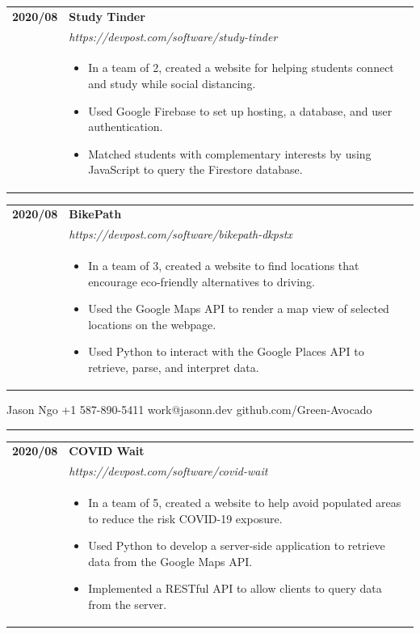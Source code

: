 \documentclass[letterpaper]{article}
\makeatletter
\newcommand{\secondpage}{\pagebreak
                            {\small
                                Jason Ngo
                                \hfill
                                +1 587-890-5411
                                \hfill
                                work@jasonn.dev
                                \hfill
                                github.com/Green-Avocado
                            }
                            \vspace{-4pt}

                            \rule{\textwidth}{0.1pt}

                            \vspace{0.2in}}
\makeatother
\begin{document}
        \begin{tabular}{p{} p{}}
            \textbf{2020/08} & \textbf{Study Tinder} \\
            & \emph{https://devpost.com/software/study-tinder} \\
            & \begin{itemize}
                \item In a team of 2, created a website for helping students connect and study while
                    social distancing.
                \item Used Google Firebase to set up hosting, a database, and user authentication.
                \item Matched students with complementary interests by using JavaScript to query the
                    Firestore database.
            \end{itemize}
        \end{tabular}

        \begin{tabular}{p{} p{}}
            \textbf{2020/08} & \textbf{BikePath} \\
            & \emph{https://devpost.com/software/bikepath-dkpstx} \\
            & \begin{itemize}
                \item In a team of 3, created a website to find locations that encourage eco-friendly
                    alternatives to driving.
                \item Used the Google Maps API to render a map view of selected locations on the webpage.
                \item Used Python to interact with the Google Places API to retrieve, parse, and
                    interpret data.
            \end{itemize}
        \end{tabular}

    \secondpage

        \begin{tabular}{p{} p{}}
            \textbf{2020/08} & \textbf{COVID Wait} \\
            & \emph{https://devpost.com/software/covid-wait} \\
            & \begin{itemize}
                \item In a team of 5, created a website to help avoid populated areas to reduce the risk
                    COVID-19 exposure.
                \item Used Python to develop a server-side application to retrieve data from the Google
                    Maps API.
                \item Implemented a RESTful API to allow clients to query data from the server.
            \end{itemize}
        \end{tabular}
\end{document}
